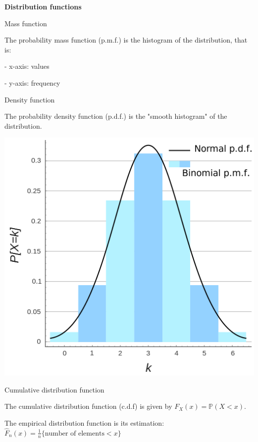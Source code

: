 {\fontsize{12pt}{22pt} \textbf{Distribution functions}\par}

\vspace{5mm}

Mass function

The probability mass function (p.m.f.) is the histogram of the distribution, that is:

- x-axis: values

- y-axis: frequency

\vspace{5mm}

Density function

The probability density function (p.d.f.) is the "smooth histogram" of the distribution.

\vspace{5mm}

\begin{center}
\includegraphics[scale=0.15]{mass_density_functions.png}
\end{center}

\vspace{5mm}

Cumulative distribution function

The cumulative distribution function (c.d.f) is given by $F_X(x)= \mathbb{P}(X < x)$. 

The empirical distribution function is its estimation:
$\widehat{F}_n(x) = \frac{1}{n}\{\text{number of elements} < x\}$

